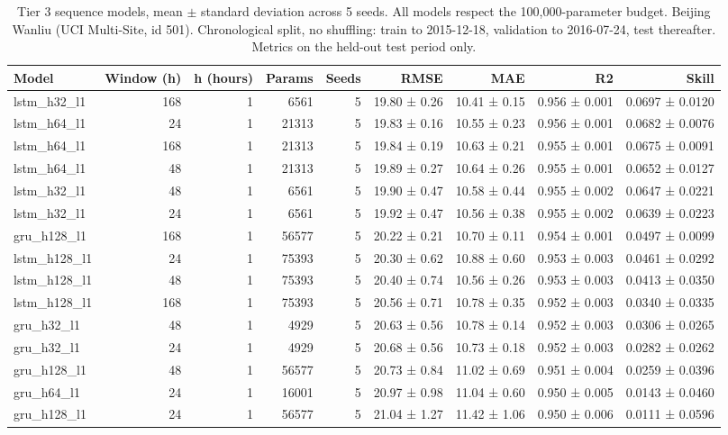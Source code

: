 \begin{table}[htbp]
\caption{Tier 3 sequence models, mean $\pm$ standard deviation across 5 seeds. All models respect the 100,000-parameter budget. Beijing Wanliu (UCI Multi-Site, id 501). Chronological split, no shuffling: train to 2015-12-18, validation to 2016-07-24, test thereafter. Metrics on the held-out test period only.}
\label{tab:tier3_sequence}
\begin{tabular}{lrrrrrrrr}
\toprule
Model & Window (h) & h (hours) & Params & Seeds & RMSE & MAE & R2 & Skill \\
\midrule
lstm\_h32\_l1 & 168 & 1 & 6561 & 5 & 19.80 ± 0.26 & 10.41 ± 0.15 & 0.956 ± 0.001 & 0.0697 ± 0.0120 \\
lstm\_h64\_l1 & 24 & 1 & 21313 & 5 & 19.83 ± 0.16 & 10.55 ± 0.23 & 0.956 ± 0.001 & 0.0682 ± 0.0076 \\
lstm\_h64\_l1 & 168 & 1 & 21313 & 5 & 19.84 ± 0.19 & 10.63 ± 0.21 & 0.955 ± 0.001 & 0.0675 ± 0.0091 \\
lstm\_h64\_l1 & 48 & 1 & 21313 & 5 & 19.89 ± 0.27 & 10.64 ± 0.26 & 0.955 ± 0.001 & 0.0652 ± 0.0127 \\
lstm\_h32\_l1 & 48 & 1 & 6561 & 5 & 19.90 ± 0.47 & 10.58 ± 0.44 & 0.955 ± 0.002 & 0.0647 ± 0.0221 \\
lstm\_h32\_l1 & 24 & 1 & 6561 & 5 & 19.92 ± 0.47 & 10.56 ± 0.38 & 0.955 ± 0.002 & 0.0639 ± 0.0223 \\
gru\_h128\_l1 & 168 & 1 & 56577 & 5 & 20.22 ± 0.21 & 10.70 ± 0.11 & 0.954 ± 0.001 & 0.0497 ± 0.0099 \\
lstm\_h128\_l1 & 24 & 1 & 75393 & 5 & 20.30 ± 0.62 & 10.88 ± 0.60 & 0.953 ± 0.003 & 0.0461 ± 0.0292 \\
lstm\_h128\_l1 & 48 & 1 & 75393 & 5 & 20.40 ± 0.74 & 10.56 ± 0.26 & 0.953 ± 0.003 & 0.0413 ± 0.0350 \\
lstm\_h128\_l1 & 168 & 1 & 75393 & 5 & 20.56 ± 0.71 & 10.78 ± 0.35 & 0.952 ± 0.003 & 0.0340 ± 0.0335 \\
gru\_h32\_l1 & 48 & 1 & 4929 & 5 & 20.63 ± 0.56 & 10.78 ± 0.14 & 0.952 ± 0.003 & 0.0306 ± 0.0265 \\
gru\_h32\_l1 & 24 & 1 & 4929 & 5 & 20.68 ± 0.56 & 10.73 ± 0.18 & 0.952 ± 0.003 & 0.0282 ± 0.0262 \\
gru\_h128\_l1 & 48 & 1 & 56577 & 5 & 20.73 ± 0.84 & 11.02 ± 0.69 & 0.951 ± 0.004 & 0.0259 ± 0.0396 \\
gru\_h64\_l1 & 24 & 1 & 16001 & 5 & 20.97 ± 0.98 & 11.04 ± 0.60 & 0.950 ± 0.005 & 0.0143 ± 0.0460 \\
gru\_h128\_l1 & 24 & 1 & 56577 & 5 & 21.04 ± 1.27 & 11.42 ± 1.06 & 0.950 ± 0.006 & 0.0111 ± 0.0596 \\

\end{tabular}
\end{table}
